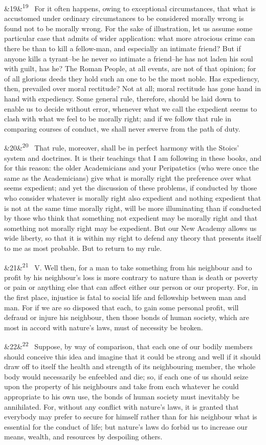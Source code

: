 \documentclass[12pt]{article}
\newcommand{\para}[1][]{\par\noindent\ifx&#1&\else\textsuperscript{\footnotesize #1}~\fi}
\begin{document}
\para[19] For it often happens, owing to exceptional circumstances, that what is accustomed under ordinary circumstances to be considered morally wrong is found not to be morally wrong. For the sake of illustration, let us assume some particular case that admits of wider application: what more atrocious crime can there be than to kill a fellow-man, and especially an intimate friend? But if anyone kills a tyrant--be he never so intimate a friend--he has not laden his soul with guilt, has he? The Roman People, at all events, are not of that opinion; for of all glorious deeds they hold such an one to be the most noble. Has expediency, then, prevailed over moral rectitude? Not at all; moral rectitude has gone hand in hand with expediency. Some general rule, therefore, should be laid down to enable us to decide without error, whenever what we call the expedient seems to clash with what we feel to be morally right; and if we follow that rule in comparing courses of conduct, we shall never swerve from the path of duty.

\para[20] That rule, moreover, shall be in perfect harmony with the Stoics' system and doctrines. It is their teachings that I am following in these books, and for this reason: the older Academicians and your Peripatetics (who were once the same as the Academicians) give what is morally right the preference over what seems expedient; and yet the discussion of these problems, if conducted by those who consider whatever is morally right also expedient and nothing expedient that is not at the same time morally right, will be more illuminating than if conducted by those who think that something not expedient may be morally right and that something not morally right may be expedient. But our New Academy allows us wide liberty, so that it is within my right to defend any theory that presents itself to me as most probable. But to return to my rule.

\para[21] V. Well then, for a man to take something from his neighbour and to profit by his neighbour's loss is more contrary to nature than is death or poverty or pain or anything else that can affect either our person or our property. For, in the first place, injustice is fatal to social life and fellowship between man and man. For if we are so disposed that each, to gain some personal profit, will defraud or injure his neighbour, then those bonds of human society, which are most in accord with nature's laws, must of necessity be broken.

\para[22] Suppose, by way of comparison, that each one of our bodily members should conceive this idea and imagine that it could be strong and well if it should draw off to itself the health and strength of its neighbouring member, the whole body would necessarily be enfeebled and die; so, if each one of us should seize upon the property of his neighbours and take from each whatever he could appropriate to his own use, the bonds of human society must inevitably be annihilated. For, without any conflict with nature's laws, it is granted that everybody may prefer to secure for himself rather than for his neighbour what is essential for the conduct of life; but nature's laws do forbid us to increase our means, wealth, and resources by despoiling others.
\end{document}
